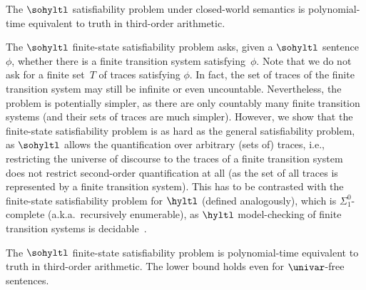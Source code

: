 \begin{cor}
\label{cor_satcomplexity_cw}
The $\sohyltl$ satisfiability problem under closed-world semantics is polynomial-time equivalent to truth in third-order arithmetic.
\end{cor}

The $\sohyltl$ finite-state satisfiability problem asks, given a $\sohyltl$ sentence~$\phi$, whether there is a finite transition system satisfying~$\phi$.
Note that we do not ask for a finite set~$T$ of traces satisfying $\phi$. In fact, the set of traces of the finite transition system may still be infinite or even uncountable. 
Nevertheless, the problem is potentially simpler, as there are only countably many finite transition systems (and their sets of traces are much simpler).
However, we show that the finite-state satisfiability problem is as hard as the general satisfiability problem, as $\sohyltl$ allows the quantification over arbitrary (sets of) traces, i.e., restricting the universe of discourse to the traces of a finite transition system does not restrict second-order quantification at all (as the set of all traces is represented by a finite transition system).
This has to be contrasted with the finite-state satisfiability problem for $\hyltl$ (defined analogously), which is $\Sigma_1^0$-complete (a.k.a.\ recursively enumerable), as $\hyltl$ model-checking of finite transition systems is decidable~\cite{ClarksonFKMRS14}.

\begin{thm}
\label{thm_finsatcomplexity}
The $\sohyltl$ finite-state satisfiability problem is polynomial-time equivalent to truth in third-order arithmetic. The lower bound holds even for $\univar$-free sentences.
\end{thm}

